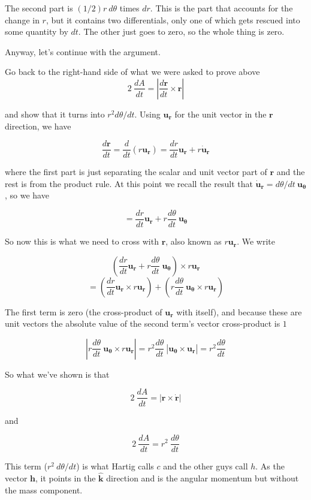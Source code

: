\documentclass[11pt, oneside]{article}
\begin{document}
The second part is $(1/2) r \ d\theta$ times $dr$.  This is the part that accounts for the change in $r$, but it contains two differentials, only one of which gets rescued into some quantity by $dt$.  The other just goes to zero, so the whole thing is zero. 

Anyway, let's continue with the argument.

Go back to the right-hand side of what we were asked to prove above
\[ 2 \ \frac{dA}{dt} =  | \frac{d\mathbf{r}}{dt} \times \mathbf{r} | \]

and show that it turns into $r^2 d\theta/dt$.  Using $\mathbf{u_r}$ for the unit vector in the $\mathbf{r}$ direction, we have

\[ \frac{d\mathbf{r}}{dt}  = \frac{d}{dt} (r \mathbf{u_r}) = \frac{dr}{dt} \mathbf{u_r} + r \dot{\mathbf{u}}_\mathbf{r} \]

where the first part is just separating the scalar and unit vector part of $\mathbf{r}$ and the rest is from the product rule.  At this point we recall the result that $\dot{\mathbf{u}}_\mathbf{r}  = d \theta/dt \ \mathbf{u_\theta}$, so we have

\[ = \frac{dr}{dt} \mathbf{u_r} + r  \frac{d \theta}{dt} \ \mathbf{u_\theta} \]

So now this is what we need to cross with $\mathbf{r}$, also known as $r \mathbf{u_r}$.  We write

\[ (\frac{dr}{dt}  \mathbf{u_r} + r  \frac{d \theta}{dt} \  \mathbf{u_\theta}) \times r  \mathbf{u_r} \]
\[ = (\frac{dr}{dt}  \mathbf{u_r} \times  r  \mathbf{u_r}) + (r  \frac{d \theta}{dt} \  \mathbf{u_\theta} \times r  \mathbf{u_r}) \]

The first term is zero (the cross-product of $\mathbf{u_r}$ with itself), and because these are unit vectors the absolute value of the second term's vector cross-product is $1$

\[ | r  \frac{d \theta}{dt} \ \mathbf{u_\theta} \times r \mathbf{u_r} | =  r^2 \frac{d \theta}{dt} \ |  \mathbf{u_\theta} \times  \mathbf{u_r} | =  r^2 \frac{d \theta}{dt} \]

So what we've shown is that 

\[ 2 \ \frac{dA}{dt} =  | \mathbf{r} \times \dot{\mathbf{r}} | \]

and

\[ 2 \ \frac{dA}{dt} =  r^2 \ \frac{d \theta}{dt} \]

This term ($r^2 \ d\theta/dt$) is what Hartig calls $c$ and the other guys call $h$.  As the vector $\mathbf{h}$, it points in the $\hat{\mathbf{k}}$ direction and is the angular momentum but without the mass component.
\end{document}
